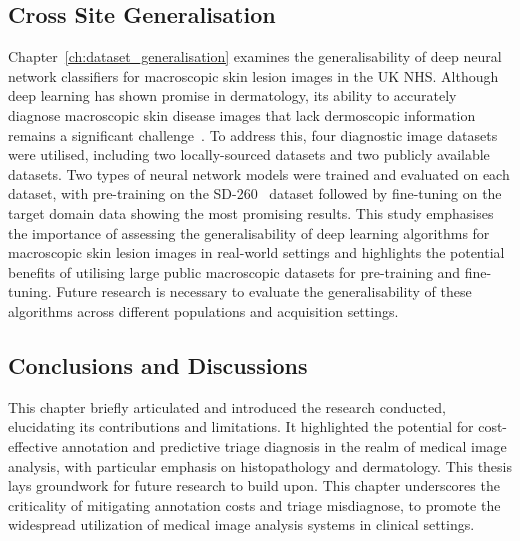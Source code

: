 \subsection*{Cross Site Generalisation}
Chapter~\ref{ch:dataset_generalisation} examines the generalisability of deep neural network classifiers for macroscopic skin lesion images in the UK NHS. Although deep learning has shown promise in dermatology, its ability to accurately diagnose macroscopic skin disease images that lack dermoscopic information remains a significant challenge~\citep{jones2022artificial}. To address this, four diagnostic image datasets were utilised, including two locally-sourced datasets and two publicly available datasets. Two types of neural network models were trained and evaluated on each dataset, with pre-training on the SD-260~\citep{yang2019self} dataset followed by fine-tuning on the target domain data showing the most promising results. This study emphasises the importance of assessing the generalisability of deep learning algorithms for macroscopic skin lesion images in real-world settings and highlights the potential benefits of utilising large public macroscopic datasets for pre-training and fine-tuning. Future research is necessary to evaluate the generalisability of these algorithms across different populations and acquisition settings.

\subsection*{Conclusions and Discussions}
This chapter briefly articulated and introduced the research conducted, elucidating its contributions and limitations. It highlighted the potential for cost-effective annotation and predictive triage diagnosis in the realm of medical image analysis, with particular emphasis on histopathology and dermatology. This thesis lays groundwork for future research to build upon. This chapter underscores the criticality of mitigating annotation costs and triage misdiagnose, to promote the widespread utilization of medical image analysis systems in clinical settings.